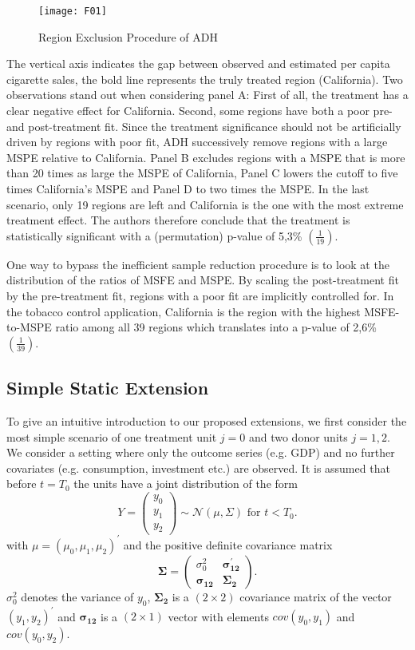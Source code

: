 \begin{figure}[H]
	\centering
	\texttt{[image: F01]}
	\caption{Region Exclusion Procedure of ADH}
	\label{F_01}
\end{figure}

The vertical axis indicates the gap between observed and estimated  per capita cigarette sales, the bold line represents the truly treated region (California). Two observations stand out when considering panel A: First of all, the treatment has a clear negative effect for California. Second, some regions have both a poor pre- and post-treatment fit. Since the treatment significance should not be artificially driven by regions with poor fit, \ac{ADH} successively remove regions with a large \ac{MSPE} relative to California. Panel B excludes regions with a \ac{MSPE} that is more than 20 times as large the \ac{MSPE} of California, Panel C lowers the cutoff to five times California's \ac{MSPE} and Panel D to  two times the \ac{MSPE}. In the last scenario, only 19 regions are left and California is the one with the most extreme treatment effect. The authors therefore conclude that the treatment is statistically significant with a (permutation) p-value of 5,3\% $\left(  \frac{1}{19} \right) $. 

One way to bypass the inefficient sample reduction procedure is to look at the distribution of the ratios of \ac{MSFE} and \ac{MSPE}. By scaling the post-treatment fit by the pre-treatment fit, regions with a poor fit are implicitly controlled for. In the tobacco control application, California is the region with the highest \ac{MSFE}-to-\ac{MSPE} ratio among all 39 regions which translates into a p-value of 2,6\% $\left(  \frac{1}{39} \right) $. 

\subsection{Simple Static Extension}
To give an intuitive introduction to our proposed extensions, we first consider the most simple scenario of one treatment unit $j = 0$ and two donor units $j = 1,2$. We consider a setting where only the outcome series (e.g. \ac{GDP}) and no further covariates (e.g. consumption, investment etc.) are observed. It is assumed that before $t = T_0$ the units have a joint distribution of the form 
\[
Y = \begin{pmatrix} y_0\\ y_1\\ y_2 \end{pmatrix} \sim \mathcal{N}(\mu,\Sigma)
\text{ for } t<T_0.
\] 
with $\mu = \left(\mu_0, \mu_1, \mu_2  \right)^\prime$ and the positive definite covariance matrix
\[
\boldsymbol{\Sigma} = \begin{pmatrix} \sigma_0^2 & \boldsymbol{\sigma_{12}^\prime} \\
	\boldsymbol{\sigma_{12}} & \boldsymbol{\Sigma_2} \end{pmatrix}.
\] 
$\sigma_0^2$ denotes the variance of $y_0$, $\boldsymbol{\Sigma_2}$ is a $(2 \times 2)$ covariance matrix of the vector $(y_1, y_2)^\prime$ and $\boldsymbol{\sigma_{12}}$ is a $(2 \times 1)$ vector with elements $cov(y_0, y_1)$ and $cov(y_0, y_2)$.

